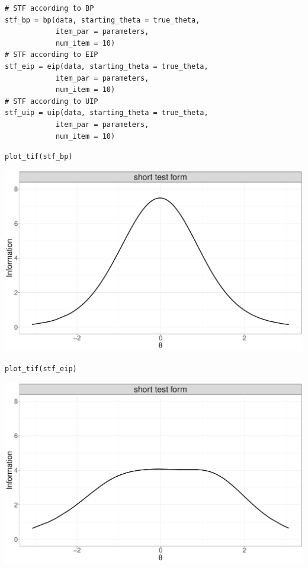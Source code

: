 \documentclass[aspectratio=149, compress]{beamer}
\begin{document}
\begin{frame}[fragile]
	\begin{verbatim}
# STF according to BP 
stf_bp = bp(data, starting_theta = true_theta, 
			item_par = parameters,
			num_item = 10)
# STF according to EIP
stf_eip = eip(data, starting_theta = true_theta, 
			item_par = parameters, 
			num_item = 10)
# STF according to UIP
stf_uip = uip(data, starting_theta = true_theta, 
			item_par = parameters, 
			num_item = 10)
	\end{verbatim}
\end{frame}


\begin{frame}[fragile]

\begin{overprint}
	\centering
	
	\texttt{plot\_tif(stf\_bp)}
	
	\includegraphics[width=.90\linewidth]{img/stf-bp}
	
	\centering
	
	\texttt{plot\_tif(stf\_eip)}
	
	\includegraphics[width=.90\linewidth]{img/stf-eip}
	

\end{overprint}
\end{frame}
\end{document}
